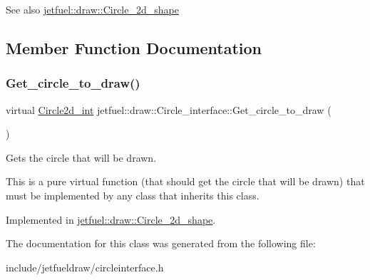\begin{DoxySeeAlso}{See also}
\hyperlink{classjetfuel_1_1draw_1_1Circle__2d__shape}{jetfuel\+::draw\+::\+Circle\+\_\+2d\+\_\+shape} 
\end{DoxySeeAlso}


\subsection{Member Function Documentation}
\mbox{\label{classjetfuel_1_1draw_1_1Circle__interface_a992a93bc130288ec4c9c4d2fa4203341}} 
\subsubsection{\texorpdfstring{Get\+\_\+circle\+\_\+to\+\_\+draw()}{Get\_circle\_to\_draw()}}
{\footnotesize\ttfamily virtual \hyperlink{classjetfuel_1_1draw_1_1Circle2d}{Circle2d\+\_\+int} jetfuel\+::draw\+::\+Circle\+\_\+interface\+::\+Get\+\_\+circle\+\_\+to\+\_\+draw (\begin{DoxyParamCaption}{ }\end{DoxyParamCaption})\hspace{0.3cm}{\ttfamily [pure virtual]}}



Gets the circle that will be drawn. 

This is a pure virtual function (that should get the circle that will be drawn) that must be implemented by any class that inherits this class. 

Implemented in \hyperlink{classjetfuel_1_1draw_1_1Circle__2d__shape_ab188ed6716dff22d0498a01ac1e93d90}{jetfuel\+::draw\+::\+Circle\+\_\+2d\+\_\+shape}.



The documentation for this class was generated from the following file\+:\begin{DoxyCompactItemize}
\item 
include/jetfueldraw/circleinterface.\+h\end{DoxyCompactItemize}
